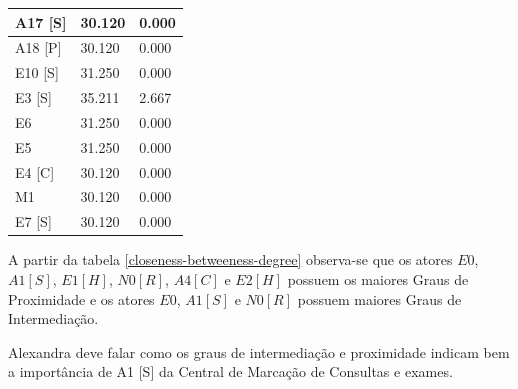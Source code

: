 \begin{table}[htbp]
\begin{tabular}{|l|l|l|}
A17 {[}S{]}   & 30.120              & 0.000                 \\ \hline
A18 {[}P{]}   & 30.120              & 0.000                 \\ \hline
E10 {[}S{]}   & 31.250              & 0.000                 \\ \hline
E3 {[}S{]}    & 35.211              & 2.667                 \\ \hline
E6            & 31.250              & 0.000                 \\ \hline
E5            & 31.250              & 0.000                 \\ \hline
E4 {[}C{]}    & 30.120              & 0.000                 \\ \hline
M1            & 30.120              & 0.000                 \\ \hline
E7 {[}S{]}    & 30.120              & 0.000                 \\ \hline
\end{tabular}
\end{table}

A partir da tabela \ref{closeness-betweeness-degree} observa-se que os atores $E0$, $A1 [S]$, $E1 [H]$, $N0 [R]$, $A4 [C]$ e $E2 [H]$ possuem os maiores Graus de Proximidade e os atores $E0$, $A1 [S]$ e $N0 [R]$ possuem maiores Graus de Intermediação.

Alexandra deve falar como os graus de intermediação e proximidade indicam bem a importância de A1 [S] da Central de Marcação de Consultas e exames.